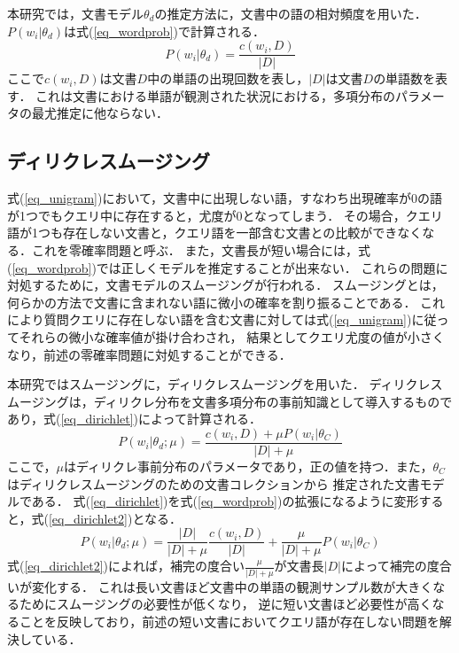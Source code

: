 本研究では，文書モデル$\theta_d$の推定方法に，文書中の語の相対頻度を用いた．
$P(w_i|\theta_d)$は式(\ref{eq_wordprob})で計算される．
\begin{equation}
    P(w_i|\theta_d) = \frac{c(w_i,D)}{|D|}    \label{eq_wordprob}
\end{equation}
ここで$c(w_i,D)$は文書$D$中の単語の出現回数を表し，$|D|$は文書$D$の単語数を表す．
これは文書における単語が観測された状況における，多項分布のパラメータの最尤推定に他ならない．

\subsection{ディリクレスムージング}  \label{sec_dirichlet}
式(\ref{eq_unigram})において，文書中に出現しない語，すなわち出現確率が0の語が1つでもクエリ中に存在すると，尤度が0となってしまう．
その場合，クエリ語が1つも存在しない文書と，クエリ語を一部含む文書との比較ができなくなる．これを零確率問題と呼ぶ．
また，文書長が短い場合には，式(\ref{eq_wordprob})では正しくモデルを推定することが出来ない．
これらの問題に対処するために，文書モデルのスムージングが行われる．
スムージングとは，何らかの方法で文書に含まれない語に微小の確率を割り振ることである．
これにより質問クエリに存在しない語を含む文書に対しては式(\ref{eq_unigram})に従ってそれらの微小な確率値が掛け合わされ，
結果としてクエリ尤度の値が小さくなり，前述の零確率問題に対処することができる．

本研究ではスムージングに，ディリクレスムージングを用いた．
ディリクレスムージングは，ディリクレ分布を文書多項分布の事前知識として導入するものであり，式(\ref{eq_dirichlet})によって計算される．
\begin{equation}
    P(w_i|\theta_d;\mu) = \frac{ c(w_i, D) + \mu P(w_i|\theta_C) }{ |D| + \mu } \label{eq_dirichlet}
\end{equation}
ここで，$\mu$はディリクレ事前分布のパラメータであり，正の値を持つ．また，$\theta_C$はディリクレスムージングのための文書コレクションから
推定された文書モデルである．
式(\ref{eq_dirichlet})を式(\ref{eq_wordprob})の拡張になるように変形すると，式(\ref{eq_dirichlet2})となる．
\begin{equation}
    P(w_i|\theta_d;\mu) = \frac{|D|}{|D|+\mu} \frac{c(w_i, D)}{|D|} + \frac{\mu}{|D|+\mu}P(w_i|\theta_C)  \label{eq_dirichlet2}
\end{equation}
式(\ref{eq_dirichlet2})によれば，補完の度合い$\frac{\mu}{|D|+\mu}$が文書長$|D|$によって補完の度合いが変化する．
これは長い文書ほど文書中の単語の観測サンプル数が大きくなるためにスムージングの必要性が低くなり，
逆に短い文書ほど必要性が高くなることを反映しており，前述の短い文書においてクエリ語が存在しない問題を解決している．

